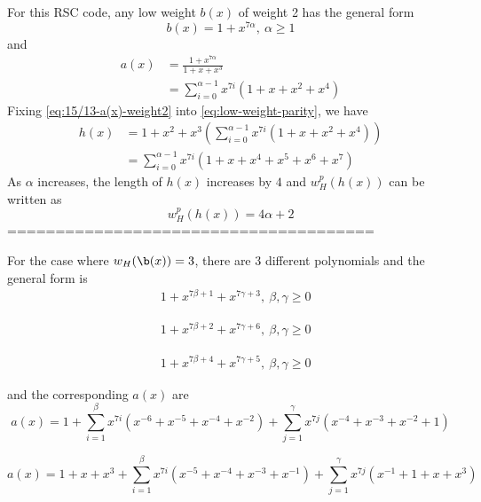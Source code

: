 \documentclass[11pt, oneside, dvipdfmx]{book}
\begin{document}
\begin{example}[15/13 RSC code, $f(x)=1+x^2+x^3,~g(x)=1+x+x^3$]
For this RSC code, any low weight $b(x)$ of weight 2 has the general form 
\begin{equation}
b(x)=1+x^{7\alpha},~\alpha \geq 1
\label{eq:15/13-weight-2}
\end{equation}
and 
\begin{equation}
\begin{split}
a(x)&=\frac{1+x^{7\alpha}}{1+x+x^3}\\
&=\sum_{i=0}^{\alpha-1}x^{7i}\left(1+x+x^2+x^4\right)
\end{split}
\label{eq:15/13-a(x)-weight2}
\end{equation}
Fixing \eqref{eq:15/13-a(x)-weight2} into \eqref{eq:low-weight-parity}, we have 
\begin{equation}
\begin{split}
h(x)&=1+x^2+x^3\left(\sum_{i=0}^{\alpha-1}x^{7i}\left(1+x+x^2+x^4\right)\right)\\
&=\sum_{i=0}^{\alpha-1}x^{7i}\left(1+x+x^4+x^5+x^6+x^7\right)
\end{split}
\label{eq:15/13-h(x)-weight2}
\end{equation}
As $\alpha$ increases, the length of $h(x)$ increases by $4$ and $w_H^{p}(h(x))$ can be written as $$w_H^{p}(h(x))=4\alpha+2$$
======================================

For the case where $w_H(\b(x))=3$, there are 3 different polynomials and the general form is
\begin{align}
&1+x^{7\beta +1}+x^{7\gamma+3},~\beta,\gamma \geq 0
\label{eq:15/13-weight-3a}
\end{align}

\begin{align}
&1+x^{7\beta +2}+x^{7\gamma+6},~\beta,\gamma \geq 0
\label{eq:15/13-weight-3b}
\end{align}

\begin{align}
&1+x^{7\beta +4}+x^{7\gamma+5},~\beta,\gamma \geq 0
\label{eq:15/13-weight-3c}
\end{align}


and the corresponding $a(x)$ are
\begin{equation}
a(x)=1+\sum_{i=1}^{\beta}x^{7i}\left(x^{-6}+x^{-5}+x^{-4}+x^{-2}\right) + \sum_{j=1}^{\gamma}x^{7j}\left(x^{-4}+x^{-3}+x^{-2}+1\right)
\label{eq:15/13-a(x)-weight3a}
\end{equation}

\begin{equation}
a(x)=1+x+x^3+\sum_{i=1}^{\beta}x^{7i}\left(x^{-5}+x^{-4}+x^{-3}+x^{-1}\right) + \sum_{j=1}^{\gamma}x^{7j}\left(x^{-1}+1+x+x^{3}\right)
\label{eq:15/13-a(x)-weight3b}
\end{equation}


\end{example}
\end{document}

